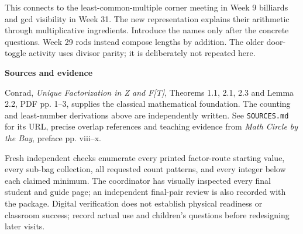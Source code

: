 \documentclass[11pt]{article}
\newcommand{\sub}[1]{\par\textbf{#1}\par}
\begin{document}
This connects to the least-common-multiple corner meeting in Week 9 billiards and gcd visibility in Week 31. The new representation explains their arithmetic through multiplicative ingredients. Introduce the names only after the concrete questions. Week 29 rods instead compose lengths by addition. The older door-toggle activity uses divisor parity; it is deliberately not repeated here.

\sub{Sources and evidence}
Conrad, \emph{Unique Factorization in Z and F[T]}, Theorems 1.1, 2.1, 2.3 and Lemma 2.2, PDF pp. 1--3, supplies the classical mathematical foundation. The counting and least-number derivations above are independently written. See \texttt{SOURCES.md} for its URL, precise overlap references and teaching evidence from \emph{Math Circle by the Bay}, preface pp. viii--x.

Fresh independent checks enumerate every printed factor-route starting value, every sub-bag collection, all requested count patterns, and every integer below each claimed minimum. The coordinator has visually inspected every final student and guide page; an independent final-pair review is also recorded with the package. Digital verification does not establish physical readiness or classroom success; record actual use and children's questions before redesigning later visits.
\end{document}

